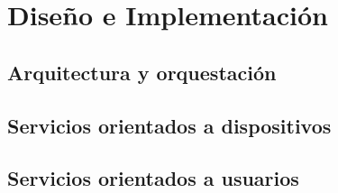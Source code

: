 \chapter{Diseño e Implementación}
\label{Chapter3}

	\section{Arquitectura y orquestación}

	\section{Servicios orientados a dispositivos}
	
	\section{Servicios orientados a usuarios}